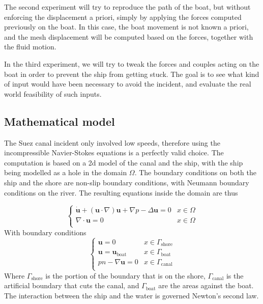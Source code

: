\documentclass[a4paper]{article}
\begin{document}
The second experiment will try to reproduce the path of the boat, but without enforcing the displacement a priori, simply by applying the forces computed previously on the boat. In this case, the boat movement is not known a priori, and the mesh displacement will be computed based on the forces, together with the fluid motion. 

In the third experiment, we will try to tweak the forces and couples acting on the boat in order to prevent the ship from getting stuck. The goal is to see what kind of input would have been necessary to avoid the incident, and evaluate the real world feasibility of such inputs.


\subsection{Mathematical model}
The Suez canal incident only involved low speeds, therefore using the incompressible Navier-Stokes equations is a perfectly valid choice. The computation is based on a 2d model of the canal and the ship, with the ship being modelled as a hole in the domain $\Omega$. The boundary conditions on both the ship and the shore are non-slip boundary conditions, with Neumann boundary conditions on the river. The resulting equations inside the domain are thus

\[
	\begin{cases}
		\Dot{\bm{u}} + (\bm{u}\cdot \nabla) \bm{u} +\nabla p - \Delta \bm{u} = 0 & x \in \Omega \\
		\nabla \cdot \bm{u} = 0  & x \in \Omega\\
	\end{cases}
\]
With boundary conditions
\[
	\begin{cases}
		\bm{u} = 0  & x\in \Gamma_\text{shore} \\
		\bm{u} = \bm{u}_\text{boat} & x\in \Gamma_\text{boat}\\
		pn - \nabla \bm{u} = 0  & x\in \Gamma_\text{canal} \\
	\end{cases}
\]
Where $\Gamma_\text{shore}$ is the portion of the boundary that is on the shore, $\Gamma_\text{canal}$ is the artificial boundary that cuts the canal, and $\Gamma_\text{boat}$ are the areas against the boat. The interaction between the ship and the water is governed Newton's second law.
\end{document}
